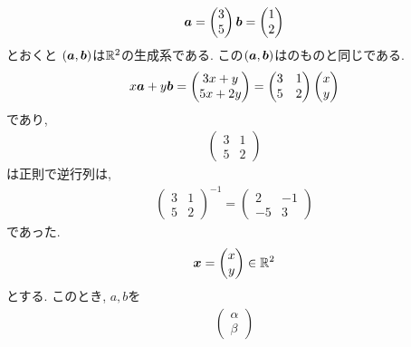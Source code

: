 \begin{example}
  \label{ex:gens:2}
  \begin{align*}
    \boldsymbol{a}=\begin{pmatrix}3\\5\end{pmatrix}
    \boldsymbol{b}=\begin{pmatrix}1\\2\end{pmatrix}
  \end{align*}
  とおくと
  $(\boldsymbol{a},\boldsymbol{b})$は$\mathbb{R}^2$の生成系である.
  この$(\boldsymbol{a},\boldsymbol{b})$はのものと同じである.
  \begin{align*}
    x\boldsymbol{a}+y\boldsymbol{b}=
    \begin{pmatrix}
      3x+y\\5x+2y
    \end{pmatrix}
    =
    \begin{pmatrix}
      3&1\\5&2
    \end{pmatrix}
    \begin{pmatrix}
      x\\y
    \end{pmatrix}
  \end{align*}
  であり,
  \begin{align*}
    \begin{pmatrix}
      3&1\\5&2
    \end{pmatrix}
  \end{align*}
  は正則で逆行列は,
  \begin{align*}
    \begin{pmatrix}
      3&1\\5&2
    \end{pmatrix}^{-1}
=    
    \begin{pmatrix}
      2&-1\\-5&3
    \end{pmatrix}
  \end{align*}
  であった.
  \begin{align*}
    \boldsymbol{x}=
   \begin{pmatrix}
      x\\y
    \end{pmatrix}\in\mathbb{R}^2
  \end{align*}
  とする.
  このとき, $a,b$を
  \begin{align*}
    \begin{pmatrix}
      \alpha\\\beta
    \end{pmatrix}

\end{align*}
\end{example}
